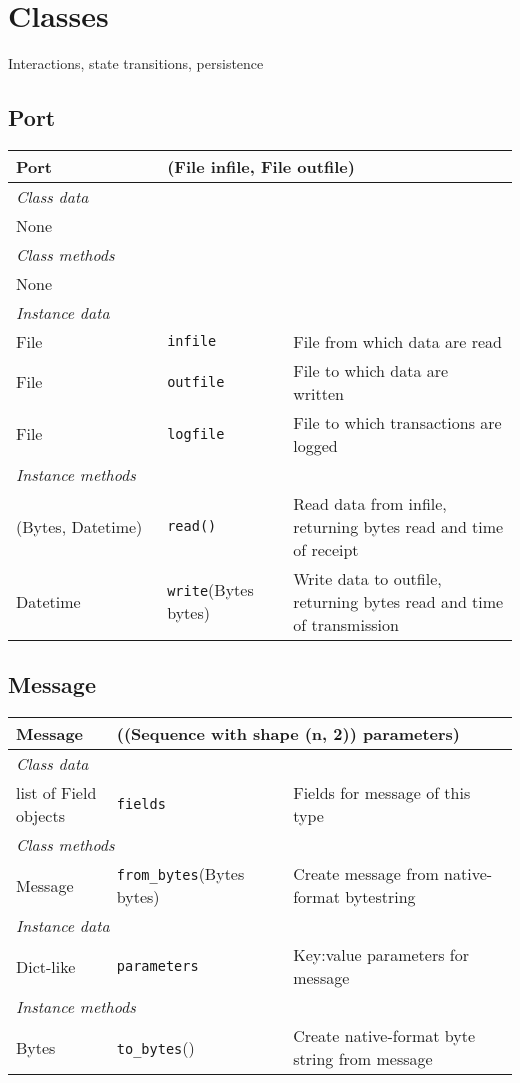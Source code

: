 \documentclass[pdftex,oneside,12pt,a4paper]{book}
\begin{document}
\chapter{Classes}
Interactions, state transitions, persistence

\section{Port}
\begin{tabular}{|p{0.3\linewidth}p{0.25\linewidth}p{0.45\linewidth}|}
\hline
Port & \multicolumn{2}{l|}{(File infile, File outfile)} \\
\hline\multicolumn{3}{|l|}{\small\emph{Class data}}\\
None && \\
\hline\multicolumn{3}{|l|}{\small\emph{Class methods}}\\
None && \\
\hline\multicolumn{3}{|l|}{\small\emph{Instance data}}\\
File & \verb|infile| & File from which data are read \\
File  & \verb|outfile| & File to which data are written\\
File & \verb|logfile| & File to which transactions are logged\\
\hline\multicolumn{3}{|l|}{\small\emph{Instance methods}}\\
(Bytes, Datetime) & \verb|read()| & Read data from infile, returning bytes read and time of receipt\\
Datetime  & \verb|write|(Bytes bytes) & Write data to outfile, returning bytes read and time of transmission\\\hline
\end{tabular}

\section{Message}
\begin{tabular}{|p{0.2\linewidth}p{0.35\linewidth}p{0.45\linewidth}|}
\hline
Message & \multicolumn{2}{l|}{((Sequence with shape (n, 2)) parameters)} \\
\hline\multicolumn{3}{|l|}{\small\emph{Class data}}\\
list of Field objects & \verb|fields| & Fields for message of this type \\
\hline\multicolumn{3}{|l|}{\small\emph{Class methods}}\\
Message & \verb|from_bytes|(Bytes bytes) & Create message from native-format bytestring\\
\hline\multicolumn{3}{|l|}{\small\emph{Instance data}}\\
Dict-like & \verb|parameters| & Key:value parameters for message \\
\hline\multicolumn{3}{|l|}{\small\emph{Instance methods}}\\
Bytes & \verb|to_bytes|() & Create native-format byte string from message\\
\hline
\end{tabular}
\end{document}
